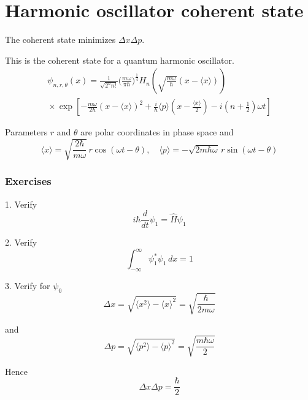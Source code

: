 

\section*{Harmonic oscillator coherent state}

The coherent state minimizes $\Delta x\Delta p$.

\bigskip
This is the coherent state for a quantum harmonic oscillator.
\begin{multline*}
\psi_{n,r,\theta}(x)
=\frac{1}{\sqrt{2^nn!}}
\biggl(\frac{m\omega}{\pi\hbar}\biggr)^\frac{1}{4}
H_n\left(\sqrt{\frac{m\omega}{\hbar}}\left(x-\langle x\rangle\right)\right)
\\{}\times
\exp\left[
-\frac{m\omega}{2\hbar}\left(x-\langle x\rangle\right)^2
+\frac{i}{\hbar}\langle p\rangle\left(x-\frac{\langle x\rangle}{2}\right)
-i\left(n+\frac{1}{2}\right)\omega t
\right]
\end{multline*}

Parameters $r$ and $\theta$ are polar coordinates in phase space and
\begin{equation*}
\langle x\rangle=\sqrt{\frac{2\hbar}{m\omega}}\,r\cos(\omega t-\theta),\quad
\langle p\rangle=-\sqrt{2m\hbar\omega}\,r\sin(\omega t-\theta)
\end{equation*}

\subsubsection*{Exercises}

1. Verify
\begin{equation*}
i\hbar\frac{d}{dt}\psi_1=\hat H\psi_1
\end{equation*}

2. Verify
\begin{equation*}
\int_{-\infty}^\infty\psi_1^*\psi_1\,dx=1
\end{equation*}

3. Verify for $\psi_0$
\begin{equation*}
\Delta x=\sqrt{\langle x^2\rangle-\langle x\rangle^2}
=\sqrt{\frac{\hbar}{2m\omega}}
\end{equation*}

and
\begin{equation*}
\Delta p=\sqrt{\langle p^2\rangle-\langle p\rangle^2}
=\sqrt{\frac{m\hbar\omega}{2}}
\end{equation*}

Hence
\begin{equation*}
\Delta x\Delta p=\frac{\hbar}{2}
\end{equation*}


